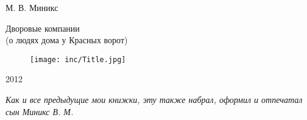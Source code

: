 \thispagestyle{empty} 

\begin{center}
М. В. Миникс

\vfill

\large Дворовые компании \\(о людях дома у Красных ворот)

\vfill

\begin{figure}[ht]
  \centering
  \texttt{[image: inc/Title.jpg]}
\end{figure}

\vfill

2012

\end{center}

\newpage

\thispagestyle{empty} 




\textit{Как и все предыдущие мои книжки, эту также набрал, оформил и отпечатал сын Миникс В. М.}



\newpage
\restoregeometry
